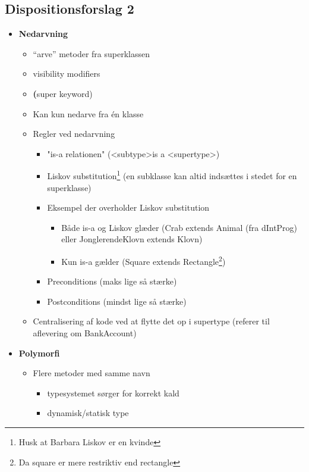 \subsection{Dispositionsforslag 2}

\begin{itemize}
    \item \textbf{Nedarvning}
    \begin{itemize}
        \item “arve” metoder fra superklassen
        \item visibility modifiers
        \item \textbf(super keyword)
        \item Kan kun nedarve fra én klasse
        \item Regler ved nedarvning
        \begin{itemize}
            \item "is-a relationen" (\textless subtype\textgreater is a \textless supertype\textgreater)
            \item Liskov substitution\footnote{Husk at Barbara Liskov er en kvinde} (en subklasse kan altid indsættes i stedet for en superklasse)
            \item Eksempel der overholder Liskov substitution
            \begin{itemize}
                \item Både is-a og Liskov glæder (Crab extends Animal (fra dIntProg) eller JonglerendeKlovn extends Klovn)
                \item Kun is-a gælder (Square extends Rectangle\footnote{Da square er mere restriktiv end rectangle})
            \end{itemize}
            
            \item Preconditions (maks lige så stærke)
            \item Postconditions (mindst lige så stærke)
        \end{itemize}
        
        \item Centralisering af kode ved at flytte det op i supertype (referer til aflevering om BankAccount)
    \end{itemize}
    
    \item \textbf{Polymorfi}
    \begin{itemize}
        \item Flere metoder med samme navn
        \begin{itemize}
            \item typesystemet sørger for korrekt kald
            \item dynamisk/statisk type
        \end{itemize}
        

\end{itemize}
\end{itemize}
